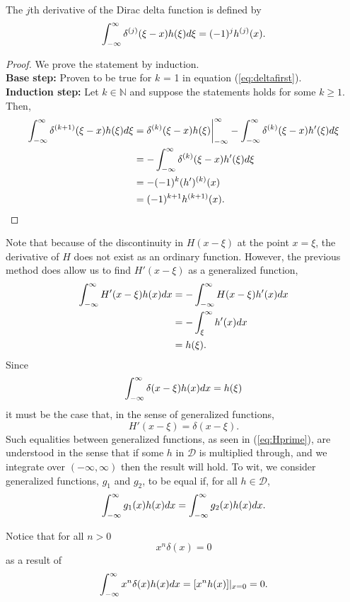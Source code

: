 \begin{theorem} \label{th:deltad}
    The \(j\)th derivative of the Dirac delta function is defined by
    \begin{equation}
         \int_{-\infty}^{\infty} \delta^{(j)}(\xi-x)h(\xi)d\xi = (-1)^jh^{(j)}(x).
    \end{equation}
\end{theorem}
\begin{proof} We prove the statement by induction.\\
    \textbf{Base step:} Proven to be true for \(k\) = 1 in equation (\ref{eq:deltafirst}).\\
    \textbf{Induction step:} Let \(k \in \mathbb{N}\) and suppose the statements holds for some \(k\geq 1\). Then,
    \begin{align*}
        \int_{-\infty}^{\infty} \delta^{(k+1)}(\xi-x)h(\xi)d\xi &= \delta^{(k)}(\xi-x)h(\xi)\biggr\rvert_{-\infty}^{\infty}-\int_{-\infty}^{\infty} \delta^{(k)}(\xi-x)h'(\xi)d\xi\\
        &=-\int_{-\infty}^{\infty} \delta^{(k)}(\xi-x)h'(\xi)d\xi\\
        &=-(-1)^{k}(h')^{(k)}(x)\\
        &=(-1)^{k+1}h^{(k+1)}(x).
    \end{align*}
\end{proof}

Note that because of the discontinuity in \(H(x-\xi)\) at the point \(x=\xi\), the derivative of \(H\) does not exist as an ordinary function. However, the previous method does allow us to find \(H'(x-\xi)\) as a generalized function, 
\begin{equation}
    \begin{split}
        \int_{-\infty}^{\infty} H'(x-\xi)h(x)dx &= -\int_{-\infty}^{\infty} H(x-\xi)h'(x)dx\\
        &=-\int_{\xi}^{\infty}h'(x)dx \\
        &= h(\xi).
    \end{split}
\end{equation}
Since
\begin{equation}
    \int_{-\infty}^{\infty} \delta(x-\xi)h(x)dx=h(\xi)
\end{equation}
it must be the case that, in the sense of generalized functions,
\begin{equation}\label{eq:Hprime}
    H'(x-\xi) = \delta(x-\xi).
\end{equation}
Such equalities between generalized functions, as seen in (\ref{eq:Hprime}), are understood in the sense that if some \(h\) in \(\mathcal{D}\) is multiplied through, and we integrate over \((-\infty, \infty)\) then the result will hold. To wit, we consider generalized functions, \(g_1\) and \(g_2\), to be equal if, for all \(h\in \mathcal{D}\),
\begin{equation}
    \int_{-\infty}^{\infty} g_1(x)h(x)dx = \int_{-\infty}^{\infty} g_2(x)h(x)dx.
\end{equation}

Notice that for all \(n > 0\)
\begin{equation}
    x^n\delta(x)=0
\end{equation}
as a result of
\begin{equation}
    \int_{-\infty}^{\infty} x^n\delta(x)h(x)dx=[x^nh(x)]|_{x=0} = 0.
\end{equation}

